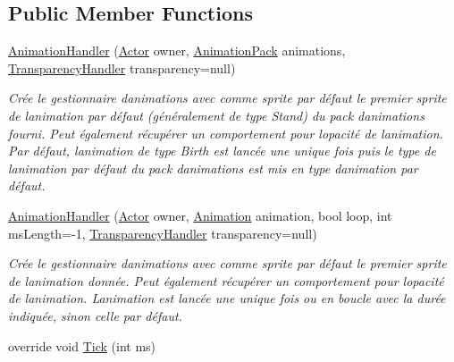 \subsection*{Public Member Functions}
\begin{DoxyCompactItemize}
\item 
\hyperlink{class_tentacle_slicers_1_1graphics_1_1_animation_handler_a08c5657382776774bfa54a9ea571447a}{Animation\+Handler} (\hyperlink{class_tentacle_slicers_1_1actors_1_1_actor}{Actor} owner, \hyperlink{class_tentacle_slicers_1_1graphics_1_1_animation_pack}{Animation\+Pack} animations, \hyperlink{class_tentacle_slicers_1_1graphics_1_1_transparency_handler}{Transparency\+Handler} transparency=null)
\begin{DoxyCompactList}\small\item\em Crée le gestionnaire d\textquotesingle{}animations avec comme sprite par défaut le premier sprite de l\textquotesingle{}animation par défaut (généralement de type Stand) du pack d\textquotesingle{}animations fourni. Peut également récupérer un comportement pour l\textquotesingle{}opacité de l\textquotesingle{}animation. Par défaut, l\textquotesingle{}animation de type Birth est lancée une unique fois puis le type de l\textquotesingle{}animation par défaut du pack d\textquotesingle{}animations est mis en type d\textquotesingle{}animation par défaut. \end{DoxyCompactList}\item 
\hyperlink{class_tentacle_slicers_1_1graphics_1_1_animation_handler_a715079dfbfd41b8ba8bfe1b4433876a3}{Animation\+Handler} (\hyperlink{class_tentacle_slicers_1_1actors_1_1_actor}{Actor} owner, \hyperlink{class_tentacle_slicers_1_1graphics_1_1_animation}{Animation} animation, bool loop, int ms\+Length=-\/1, \hyperlink{class_tentacle_slicers_1_1graphics_1_1_transparency_handler}{Transparency\+Handler} transparency=null)
\begin{DoxyCompactList}\small\item\em Crée le gestionnaire d\textquotesingle{}animations avec comme sprite par défaut le premier sprite de l\textquotesingle{}animation donnée. Peut également récupérer un comportement pour l\textquotesingle{}opacité de l\textquotesingle{}animation. L\textquotesingle{}animation est lancée une unique fois ou en boucle avec la durée indiquée, sinon celle par défaut. \end{DoxyCompactList}\item 
override void \hyperlink{class_tentacle_slicers_1_1graphics_1_1_animation_handler_a898fe508064f17af1e1fed3b5470ed0c}{Tick} (int ms)

\end{DoxyCompactItemize}
